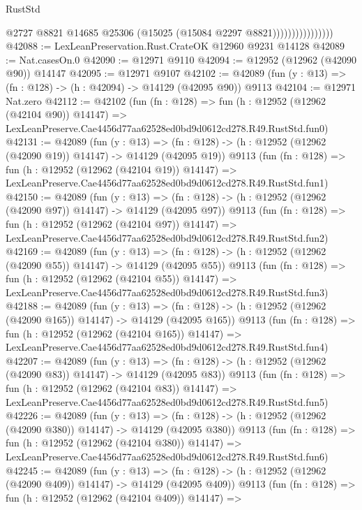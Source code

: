 \begin{lexlean}{RustStd}
\begin{coremodule}
                                @2727
                                @8821
                                @14685
                                @25306
                                (@15025 (@15084 @2297 @8821))))))))))))))))
@42088 := LexLeanPreservation.Rust.CrateOK @12960 @9231 @14128
@42089 := Nat.casesOn.{0}
@42090 := @12971 @9110
@42094 := @12952 (@12962 (@42090 @90)) @14147
@42095 := @12971 @9107
@42102 := @42089 (fun (y : @13) => (fn : @128) -> (h : @42094) -> @14129 (@42095 @90)) @9113
@42104 := @12971 Nat.zero
@42112 := @42102
    (fun (fn : @128) =>
    fun (h : @12952 (@12962 (@42104 @90)) @14147) =>
    LexLeanPreserve.Cae4456d77aa62528ed0bd9d0612cd278.R49.RustStd.fun0)
@42131 := @42089
    (fun (y : @13) =>
    (fn : @128) -> (h : @12952 (@12962 (@42090 @19)) @14147) -> @14129 (@42095 @19))
    @9113
    (fun (fn : @128) =>
    fun (h : @12952 (@12962 (@42104 @19)) @14147) =>
    LexLeanPreserve.Cae4456d77aa62528ed0bd9d0612cd278.R49.RustStd.fun1)
@42150 := @42089
    (fun (y : @13) =>
    (fn : @128) -> (h : @12952 (@12962 (@42090 @97)) @14147) -> @14129 (@42095 @97))
    @9113
    (fun (fn : @128) =>
    fun (h : @12952 (@12962 (@42104 @97)) @14147) =>
    LexLeanPreserve.Cae4456d77aa62528ed0bd9d0612cd278.R49.RustStd.fun2)
@42169 := @42089
    (fun (y : @13) =>
    (fn : @128) -> (h : @12952 (@12962 (@42090 @55)) @14147) -> @14129 (@42095 @55))
    @9113
    (fun (fn : @128) =>
    fun (h : @12952 (@12962 (@42104 @55)) @14147) =>
    LexLeanPreserve.Cae4456d77aa62528ed0bd9d0612cd278.R49.RustStd.fun3)
@42188 := @42089
    (fun (y : @13) =>
    (fn : @128) -> (h : @12952 (@12962 (@42090 @165)) @14147) -> @14129 (@42095 @165))
    @9113
    (fun (fn : @128) =>
    fun (h : @12952 (@12962 (@42104 @165)) @14147) =>
    LexLeanPreserve.Cae4456d77aa62528ed0bd9d0612cd278.R49.RustStd.fun4)
@42207 := @42089
    (fun (y : @13) =>
    (fn : @128) -> (h : @12952 (@12962 (@42090 @83)) @14147) -> @14129 (@42095 @83))
    @9113
    (fun (fn : @128) =>
    fun (h : @12952 (@12962 (@42104 @83)) @14147) =>
    LexLeanPreserve.Cae4456d77aa62528ed0bd9d0612cd278.R49.RustStd.fun5)
@42226 := @42089
    (fun (y : @13) =>
    (fn : @128) -> (h : @12952 (@12962 (@42090 @380)) @14147) -> @14129 (@42095 @380))
    @9113
    (fun (fn : @128) =>
    fun (h : @12952 (@12962 (@42104 @380)) @14147) =>
    LexLeanPreserve.Cae4456d77aa62528ed0bd9d0612cd278.R49.RustStd.fun6)
@42245 := @42089
    (fun (y : @13) =>
    (fn : @128) -> (h : @12952 (@12962 (@42090 @409)) @14147) -> @14129 (@42095 @409))
    @9113
    (fun (fn : @128) =>
    fun (h : @12952 (@12962 (@42104 @409)) @14147) =>

\end{coremodule}
\end{lexlean}
